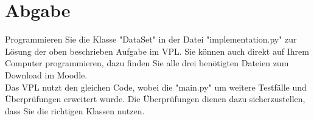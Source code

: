 \documentclass[
oneside,
12pt,
a4paper,
parskip=full
]{scrartcl}
\begin{document}
\section{Abgabe}

Programmieren Sie die Klasse "DataSet" in der Datei "implementation.py" zur Lösung der oben beschrieben Aufgabe im VPL.
Sie können auch direkt auf Ihrem Computer programmieren, dazu finden Sie alle drei benötigten Dateien zum Download im Moodle.\\
Das VPL nutzt den gleichen Code, wobei die "main.py" um weitere Testfälle und Überprüfungen erweitert wurde.
Die Überprüfungen dienen dazu sicherzustellen, dass Sie die richtigen Klassen nutzen.\\
%
\end{document}
